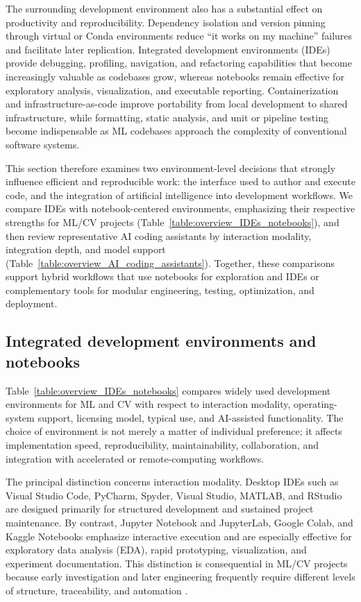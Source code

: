 \documentclass{article}
\begin{document}
The surrounding development environment also has a substantial effect on productivity and reproducibility. Dependency isolation and version pinning through virtual or Conda environments reduce ``it works on my machine'' failures and facilitate later replication. Integrated development environments (IDEs) provide debugging, profiling, navigation, and refactoring capabilities that become increasingly valuable as codebases grow, whereas notebooks remain effective for exploratory analysis, visualization, and executable reporting. Containerization and infrastructure-as-code improve portability from local development to shared infrastructure, while formatting, static analysis, and unit or pipeline testing become indispensable as ML codebases approach the complexity of conventional software systems.

This section therefore examines two environment-level decisions that strongly influence efficient and reproducible work: the interface used to author and execute code, and the integration of artificial intelligence into development workflows. We compare IDEs with notebook-centered environments, emphasizing their respective strengths for ML/CV projects (Table~\ref{table:overview_IDEs_notebooks}), and then review representative AI coding assistants by interaction modality, integration depth, and model support (Table~\ref{table:overview_AI_coding_assistants}). Together, these comparisons support hybrid workflows that use notebooks for exploration and IDEs or complementary tools for modular engineering, testing, optimization, and deployment.


\subsection{Integrated development environments and notebooks}

Table~\ref{table:overview_IDEs_notebooks} compares widely used development environments for ML and CV with respect to interaction modality, operating-system support, licensing model, typical use, and AI-assisted functionality. The choice of environment is not merely a matter of individual preference; it affects implementation speed, reproducibility, maintainability, collaboration, and integration with accelerated or remote-computing workflows.

The principal distinction concerns interaction modality. Desktop IDEs such as Visual Studio Code, PyCharm, Spyder, Visual Studio, MATLAB, and RStudio are designed primarily for structured development and sustained project maintenance. By contrast, Jupyter Notebook and JupyterLab, Google Colab, and Kaggle Notebooks emphasize interactive execution and are especially effective for exploratory data analysis (EDA), rapid prototyping, visualization, and experiment documentation. This distinction is consequential in ML/CV projects because early investigation and later engineering frequently require different levels of structure, traceability, and automation \cite{kreuzberger2023machine}.
\end{document}
